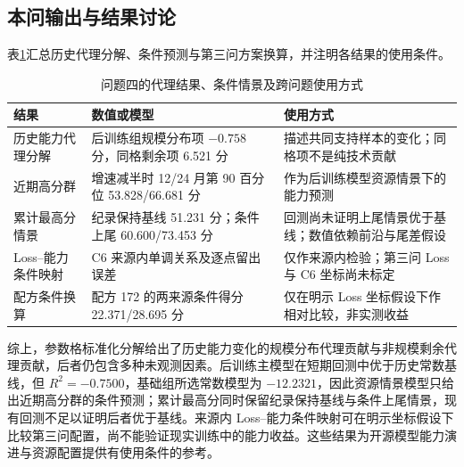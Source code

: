 \subsection{本问输出与结果讨论}

表\ref{tab:q4-output}汇总历史代理分解、条件预测与第三问方案换算，并注明各结果的使用条件。

\begin{table}[htbp]
 \centering\small
 \caption{问题四的代理结果、条件情景及跨问题使用方式}
 \label{tab:q4-output}
 \begin{tabular}{p{2.5cm}p{4.2cm}p{5.8cm}}
 \toprule
 结果 & 数值或模型 & 使用方式\\
 \midrule
 历史能力代理分解 & 后训练组规模分布项 $-0.758$ 分，同格剩余项 6.521 分 & 描述共同支持样本的变化；同格项不是纯技术贡献\\
 近期高分群 & 增速减半时 12/24 月第 90 百分位 53.828/66.681 分 & 作为后训练模型资源情景下的能力预测\\
 累计最高分情景 & 纪录保持基线 51.231 分；条件上尾 60.600/73.453 分 & 回测尚未证明上尾情景优于基线；数值依赖前沿与尾差假设\\
 Loss--能力条件映射 & C6 来源内单调关系及逐点留出误差 & 仅作来源内检验；第三问 Loss 与 C6 坐标尚未标定\\
 配方条件换算 & 配方 172 的两来源条件得分 22.371/28.695 分 & 仅在明示 Loss 坐标假设下作相对比较，非实测收益\\
 \bottomrule
 \end{tabular}
\end{table}

综上，参数格标准化分解给出了历史能力变化的规模分布代理贡献与非规模剩余代理贡献，后者仍包含多种未观测因素。后训练主模型在短期回测中优于历史常数基线，但 $R^2=-0.7500$，基础组所选常数模型为 $-12.2321$，因此资源情景模型只给出近期高分群的条件预测；累计最高分同时保留纪录保持基线与条件上尾情景，现有回测不足以证明后者优于基线。来源内 Loss--能力条件映射可在明示坐标假设下比较第三问配置，尚不能验证现实训练中的能力收益。这些结果为开源模型能力演进与资源配置提供有使用条件的参考。
